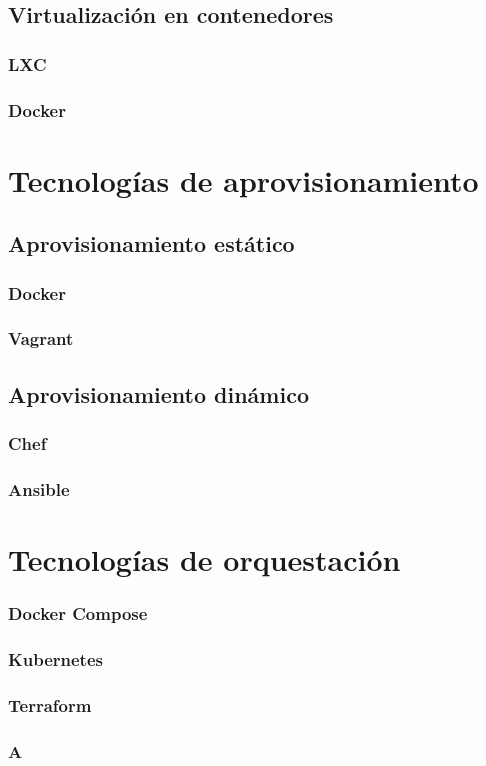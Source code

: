 \subsection{Virtualización en contenedores}
\subsubsection{LXC}
\subsubsection{Docker}
\section{Tecnologías de aprovisionamiento}
\subsection{Aprovisionamiento estático}
\subsubsection{Docker}
\subsubsection{Vagrant}
\subsection{Aprovisionamiento dinámico}
\subsubsection{Chef}
\subsubsection{Ansible}
\section{Tecnologías de orquestación}
\subsubsection{Docker Compose}
\subsubsection{Kubernetes}
\subsubsection{Terraform}
\subsubsection{A}
